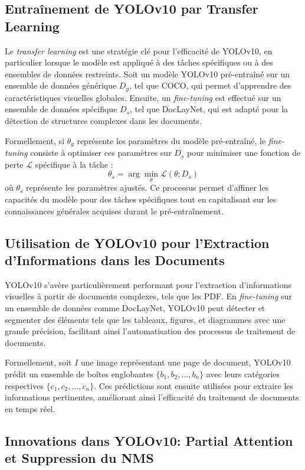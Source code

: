 \documentclass[13pt,a4paper]{article}
\begin{document}
\subsection{Entraînement de YOLOv10 par Transfer Learning}

Le \textit{transfer learning} est une stratégie clé pour l'efficacité de YOLOv10, en particulier lorsque le modèle est appliqué à des tâches spécifiques ou à des ensembles de données restreints. Soit un modèle YOLOv10 pré-entraîné sur un ensemble de données générique $D_g$, tel que COCO, qui permet d'apprendre des caractéristiques visuelles globales. Ensuite, un \textit{fine-tuning} est effectué sur un ensemble de données spécifique $D_s$, tel que DocLayNet, qui est adapté pour la détection de structures complexes dans les documents.

Formellement, si $\theta_g$ représente les paramètres du modèle pré-entraîné, le \textit{fine-tuning} consiste à optimiser ces paramètres sur $D_s$ pour minimiser une fonction de perte $\mathcal{L}$ spécifique à la tâche :
\[
\theta_s = \arg\min_{\theta} \mathcal{L}(\theta; D_s)
\]
où $\theta_s$ représente les paramètres ajustés. Ce processus permet d'affiner les capacités du modèle pour des tâches spécifiques tout en capitalisant sur les connaissances générales acquises durant le pré-entraînement.

\subsection{Utilisation de YOLOv10 pour l'Extraction d'Informations dans les Documents}

YOLOv10 s'avère particulièrement performant pour l'extraction d'informations visuelles à partir de documents complexes, tels que les PDF. En \textit{fine-tuning} sur un ensemble de données comme DocLayNet, YOLOv10 peut détecter et segmenter des éléments tels que les tableaux, figures, et diagrammes avec une grande précision, facilitant ainsi l'automatisation des processus de traitement de documents.

Formellement, soit $I$ une image représentant une page de document, YOLOv10 prédit un ensemble de boîtes englobantes $\{b_1, b_2, \dots, b_n\}$ avec leurs catégories respectives $\{c_1, c_2, \dots, c_n\}$. Ces prédictions sont ensuite utilisées pour extraire les informations pertinentes, améliorant ainsi l'efficacité du traitement de documents en temps réel.

\subsection{Innovations dans YOLOv10: Partial Attention et Suppression du NMS}
\end{document}
